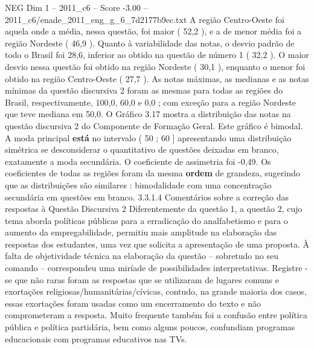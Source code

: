 \begin{textsample}{NEG Dim 1 – 2011\_c6 – Score -3.00 – 2011\_c6/enade\_2011\_eng\_g\_6\_7d2177b9ec.txt}
A região Centro-Oeste foi aquela onde a média, nessa questão, foi maior ( 52,2 ), e a de menor média foi a região Nordeste ( 46,9 ).
Quanto à variabilidade das notas, o desvio padrão de todo o Brasil foi 28,6, inferior ao obtido na questão de número 1 ( 32,2 ).
O maior desvio nessa questão foi obtido na região Nordeste ( 30,1 ), enquanto o menor foi obtido na região Centro-Oeste ( 27,7 ).
As notas máximas, as medianas e as notas mínimas da questão discursiva 2 foram as mesmas para todas as regiões do Brasil, respectivamente, 100,0, 60,0 e 0,0 ; com exceção para a região Nordeste que teve mediana em 50,0.
O Gráfico 3.17 mostra a distribuição das notas na questão discursiva 2 do Componente de Formação Geral.
Este gráfico é bimodal.
A moda principal \textbf{está} no intervalo ( 50 ; 60 ] apresentando uma distribuição simétrica se desconsiderar o quantitativo de questões deixadas em branco, exatamente a moda secundária.
O coeficiente de assimetria foi -0,49.
Os coeficientes de todas as regiões foram da mesma \textbf{ordem} de grandeza, sugerindo que as distribuições são similares : bimodalidade com uma concentração secundária em questões em branco. 3.3.1.4 Comentários sobre a correção das respostas à Questão Discursiva 2 Diferentemente da questão 1, a questão 2, cujo tema aborda políticas públicas para a erradicação do analfabetismo e para o aumento da empregabilidade, permitiu mais amplitude na elaboração das respostas dos estudantes, uma vez que solicita a apresentação de uma proposta.
À falta de objetividade técnica na elaboração da questão – sobretudo no seu comando – correspondeu uma miríade de possibilidades interpretativas.
Registre -se que não raras foram as respostas que se utilizaram de lugares comuns e exortações religiosas/humanitárias/cívicas, contudo, na grande maioria dos casos, essas exortações foram usadas como um encerramento do texto e não comprometeram a resposta.
Muito frequente também foi a confusão entre política pública e política partidária, bem como alguns poucos, confundiam programas educacionais com programas educativos nas TVs.

\end{textsample}
